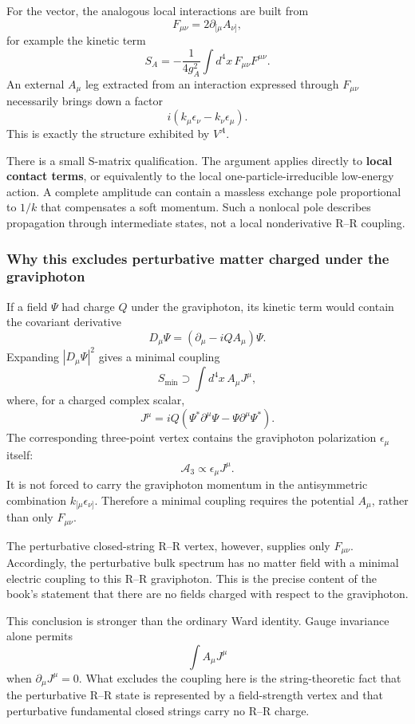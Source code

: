 \documentclass[
  10pt,
  a4paper,
  openany]{book}
\begin{document}
For the vector, the analogous local interactions are built from \[
F_{\mu\nu}=2\partial_{[\mu}A_{\nu]},
\] for example the kinetic term \[
S_A
=
-\frac1{4g_A^2}
\int d^4x\,F_{\mu\nu}F^{\mu\nu}.
\] An external \(A_\mu\) leg extracted from an interaction expressed
through \(F_{\mu\nu}\) necessarily brings down a factor \[
i(k_\mu\epsilon_\nu-k_\nu\epsilon_\mu).
\] This is exactly the structure exhibited by \(V^A\).

There is a small S-matrix qualification. The argument applies directly
to \textbf{local contact terms}, or equivalently to the local
one-particle-irreducible low-energy action. A complete amplitude can
contain a massless exchange pole proportional to \(1/k\) that
compensates a soft momentum. Such a nonlocal pole describes propagation
through intermediate states, not a local nonderivative R--R coupling.

\subsubsection{Why this excludes perturbative matter charged under the
graviphoton}\label{why-this-excludes-perturbative-matter-charged-under-the-graviphoton}

If a field \(\Psi\) had charge \(Q\) under the graviphoton, its kinetic
term would contain the covariant derivative \[
D_\mu\Psi
=
\left(\partial_\mu-iQ A_\mu\right)\Psi.
\] Expanding \(|D_\mu\Psi|^2\) gives a minimal coupling \[
S_{\mathrm{min}}
\supset
\int d^4x\,A_\mu J^\mu,
\] where, for a charged complex scalar, \[
J^\mu
=
iQ\left(
\Psi^*\partial^\mu\Psi
-\Psi\partial^\mu\Psi^*
\right).
\] The corresponding three-point vertex contains the graviphoton
polarization \(\epsilon_\mu\) itself: \[
\mathcal A_3\propto\epsilon_\mu J^\mu.
\] It is not forced to carry the graviphoton momentum in the
antisymmetric combination \(k_{[\mu}\epsilon_{\nu]}\). Therefore a
minimal coupling requires the potential \(A_\mu\), rather than only
\(F_{\mu\nu}\).

The perturbative closed-string R--R vertex, however, supplies only
\(F_{\mu\nu}\). Accordingly, the perturbative bulk spectrum has no
matter field with a minimal electric coupling to this R--R graviphoton.
This is the precise content of the book's statement that there are no
fields charged with respect to the graviphoton.

This conclusion is stronger than the ordinary Ward identity. Gauge
invariance alone permits \[
\int A_\mu J^\mu
\] when \(\partial_\mu J^\mu=0\). What excludes the coupling here is the
string-theoretic fact that the perturbative R--R state is represented by
a field-strength vertex and that perturbative fundamental closed strings
carry no R--R charge.
\end{document}
